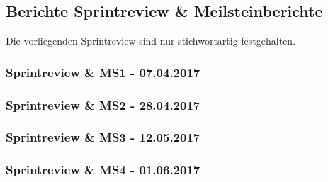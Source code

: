 \subsection{Berichte Sprintreview \& Meilsteinberichte}
Die vorliegenden Sprintreview sind nur stichwortartig festgehalten.
\subsubsection{Sprintreview \& MS1 - 07.04.2017}
\subsubsection{Sprintreview \& MS2 - 28.04.2017}
\subsubsection{Sprintreview \& MS3 - 12.05.2017}
\subsubsection{Sprintreview \& MS4 - 01.06.2017}